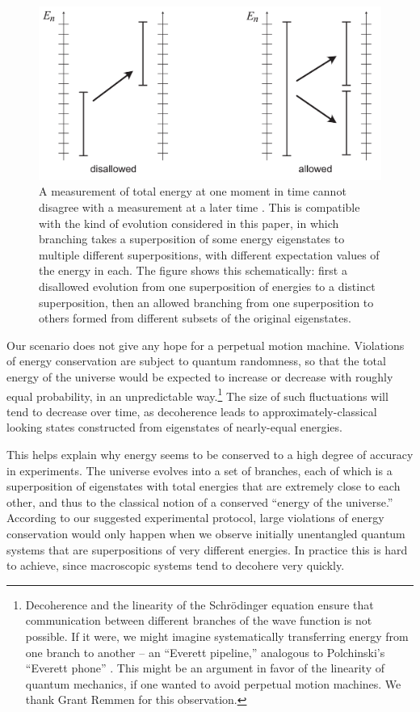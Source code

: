 \documentclass[12pt,aps,prd,onecolumn,nofootinbib,notitlepage]{revtex4-1}
\begin{document}
\begin{figure}[h]
\centering
\includegraphics[width=.6\textwidth]{allowed.pdf}
\caption{A measurement of total energy at one moment in time cannot disagree with a measurement at a later time \cite{griffiths,hartle1995conservation}.
This is compatible with the kind of evolution considered in this paper, in which branching takes a superposition of some energy eigenstates to multiple different superpositions, with different expectation values of the energy in each.
The figure shows this schematically: first a disallowed evolution from one superposition of energies to a distinct superposition, then an allowed branching from one superposition to others formed from different subsets of the original eigenstates.}
\label{fig:allowed}
\end{figure}

Our scenario does not give any hope for a perpetual motion machine.
Violations of energy conservation are subject to quantum randomness, so that the total energy of the universe would be expected to increase or decrease with roughly equal probability, in an unpredictable way.\footnote{Decoherence and the linearity of the Schr\"odinger equation ensure that communication between different branches of the wave function is not possible. If it were, we might imagine systematically transferring energy from one branch to another -- an ``Everett pipeline,'' analogous to Polchinski's ``Everett phone'' \cite{Polchinski:1990py}. This might be an argument in favor of the linearity of quantum mechanics, if one wanted to avoid perpetual motion machines. We thank Grant Remmen for this observation.}
The size of such fluctuations will tend to decrease over time, as decoherence leads to approximately-classical looking states constructed from eigenstates of nearly-equal energies.

This helps explain why energy seems to be conserved to a high degree of accuracy in experiments.
The universe evolves into a set of branches, each of which is a superposition of eigenstates with total energies that are extremely close to each other, and thus to the classical notion of a conserved ``energy of the universe.''
According to our suggested experimental protocol, large violations of energy conservation would only happen when we observe initially unentangled quantum systems that are superpositions of very different energies.
In practice this is hard to achieve, since macroscopic systems tend to decohere very quickly.
\end{document}
